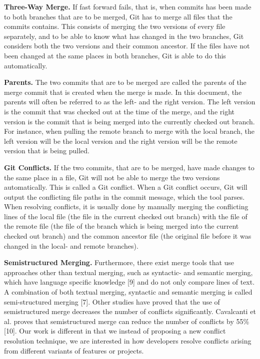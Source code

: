 \textbf{Three-Way Merge.} If fast forward fails, that is, when commits has been made to both branches that are to be merged, Git has to merge all files that the commits contains. This consists of merging the two versions of every file separately, and to be able to know what has changed in the two branches, Git considers both the two versions and their common ancestor. If the files have not been changed at the same places in both branches, Git is able to do this automatically.

\textbf{Parents.} The two commits that are to be merged are called the parents of the merge commit that is created when the merge is made. In this document, the parents will often be referred to as the left- and the right version. The left version is the commit that was checked out at the time of the merge, and the right version is the commit that is being merged into the currently checked out branch. For instance, when pulling the remote branch to merge with the local branch, the left version will be the local version and the right version will be the remote version that is being pulled.

\textbf{Git Conflicts.} If the two commits, that are to be merged, have made changes to the same place in a file, Git will not be able to merge the two versions automatically. This is called a Git conflict. When a Git conflict occurs, Git will output the conflicting file paths in the commit message, which the tool parses. When resolving conflicts, it is usually done by manually merging the conflicting lines of the local file (the file in the current checked out branch) with the file of the remote file (the file of the branch which is being merged into the current checked out branch) and the common ancestor file (the original file before it was changed in the local- and remote branches).

\textbf{Semistructured Merging.} Furthermore, there exist merge tools that use approaches other than textual merging, such as syntactic- and semantic merging, which have language specific knowledge [9] and do not only compare lines of text. A combination of both textual merging, syntactic and semantic merging is called semi-structured merging [7]. Other studies have proved that the use of semistructured merge decreases the number of conflicts significantly. Cavalcanti et al. proves that semistructured merge can reduce the number of conflicts by 55\% [10]. Our work is different in that we instead of proposing a new conflict resolution technique, we are interested in how developers resolve conflicts arising from different variants of features or projects.

